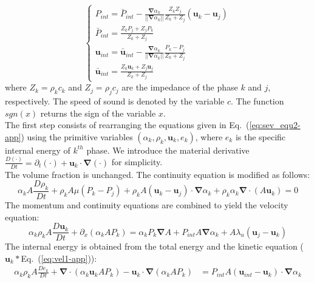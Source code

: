 \documentclass[preprint,10pt]{elsarticle}
\renewcommand{\div}{\mbold{\nabla}\! \cdot \!}
\newcommand{\grad}{\mbold{\nabla}}
\newcommand{\mbold}[1]{\boldsymbol#1}
\newcommand{\eqt}[1]{Eq.~(\ref{#1})}                     %
\begin{document}
\begin{appendices}
\begin{equation}
\label{eq:sev_equ2-app}
\left\{
\begin{array}{lll}
P_{int} = \bar{P}_{int} - \frac{\grad \alpha_k}{|| \grad \alpha_k ||} \frac{Z_k Z_j}{Z_k + Z_j} \left( \mbold u_k-\mbold u_j \right) \\
\bar{P}_{int} = \frac{Z_k P_j + Z_j P_k}{Z_k + Z_j} \\
\mbold u_{int} = \bar{\mbold u}_{int} - \frac{\grad \alpha_k}{|| \grad \alpha_k ||} \frac{P_k - P_j}{Z_k + Z_j} \\
\bar{\mbold u}_{int} = \frac{Z_k \mbold u _k + Z_j \mbold u_j}{Z_k + Z_j}
\end{array}
\right.
\end{equation}
where $Z_k = \rho_k c_k$ and $Z_j = \rho_j c_j$ are the impedance of the phase $k$ and $j$, respectively. The speed of sound is denoted by the variable $c$. The function $sgn(x)$ returns the sign of the variable $x$.\\
The first step consists of rearranging the equations given in \eqt{eq:sev_equ2-app} using the primitive variables $(\alpha_k, \rho_k, \mbold u_k, e_k)$, where $e_k$ is the specific internal energy of $k^{th}$ phase. We introduce the material derivative $\frac{D (\cdot)}{Dt} = \partial_t (\cdot) + \mbold u_k \cdot \grad (\cdot)$ for simplicity. \\
The volume fraction is unchanged. The continuity equation is modified as follows:
\begin{equation}
\label{eq:cont1-app}
\alpha_k A \frac{D \rho_k}{Dt} + \rho_k A \mu \left( P_k-P_j \right) + \rho_k A \left( \mbold u_k-\mbold u_j \right) \cdot \grad \alpha_k + \rho_k \alpha_k \div \left( A \mbold u_k \right) = 0
\end{equation}
The momentum and continuity equations are combined to yield the velocity equation:
\begin{equation}
\label{eq:vel1-app}
\alpha_k \rho_k A \frac{D\mbold u_k}{Dt} + \partial_x \left( \alpha_k A P_k \right) = \alpha_k P_k \grad A + P_{int} A \grad \alpha_k + A \lambda_u \left( \mbold u_j-\mbold u_k \right)
\end{equation}
The internal energy is obtained from the total energy and the kinetic equation ($\mbold u_k * $\eqt{eq:vel1-app}):
\begin{align}\label{eq:internal1}
\alpha_k \rho_k A \frac{D e_k}{Dt} + \div\left( \alpha_k \mbold u_k A P_k \right) - \mbold u_k \cdot \grad \left( \alpha_k A P_k \right) &= P_{int} A \left(\mbold u_{int}-\mbold u_k \right) \cdot \grad \alpha_k \nonumber \\

\end{align}
\end{appendices}
\end{document}
